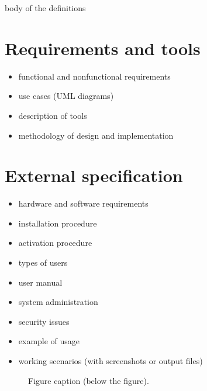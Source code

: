 \documentclass[a4paper,twoside,12pt]{book}
\newtheorem{Definition}{Definition}
\newtheorem{Example}{Example}
\newtheorem{Theorem}{Theorem}
\begin{document}
body of the definitions
%
%





\chapter{Requirements and tools}

\begin{itemize}
\item functional and nonfunctional requirements
\item use cases (UML diagrams)
\item description of tools
\item methodology of design and implementation
\end{itemize} 

\chapter{External specification}
\begin{itemize}
\item hardware and software requirements
\item installation procedure
\item activation procedure
\item types of users
\item user manual
\item system administration
\item security issues
\item example of usage
\item working scenarios (with screenshots or output files)
\end{itemize}



 
\begin{figure}
\centering
{}
\caption{Figure caption (below the figure).}
\label{fig:2}
\end{figure}
\end{document}
